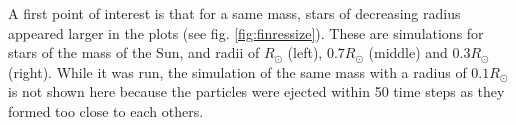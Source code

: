 \documentclass[a4paper,12pt]{article}
\begin{document}
A first point of interest is that for a same mass, stars of decreasing radius appeared larger in the plots (see fig. \ref{fig:finressize}). These are simulations for stars of the mass of the Sun, and radii of $R_\odot$ (left), $0.7  R_\odot$ (middle) and $0.3 R_\odot$ (right). While it was run, the simulation of the same mass with a radius of $0.1 R_\odot$ is not shown here because the particles were ejected within 50 time steps as they formed too close to each others.











\end{document}
